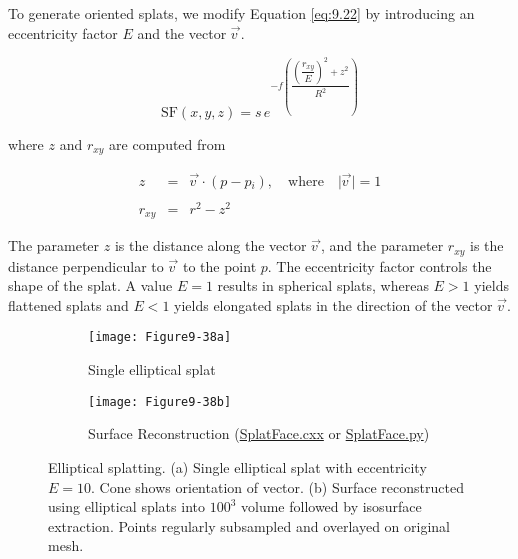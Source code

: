 To generate oriented splats, we modify Equation \ref{eq:9.22} by introducing an eccentricity factor $E$ and the vector $\overrightarrow{v\  }$.

\begin{equation}\label{eq:9.23}
\text{SF}(x, y, z) = s\, e^{-f \left( \dfrac{ \left( \dfrac {r_{xy}}{E} \right) ^2 + z^2}{R^2} \right)}
\end{equation}

\noindent where $z$ and $r_{xy}$ are computed from

\begin{equation}\label{eq:9.24}
\begin{array}{lll}
z &=& \overrightarrow{v\ } \cdot (p - p{_i}), \quad \text{where} \quad \vert \overrightarrow{v\ } \vert = 1 \\ \\
r_{xy} &=& r^2 - z^2
\end{array}
\end{equation}

The parameter $z$ is the distance along the vector $\overrightarrow{v\ }$, and the parameter $r_{xy}$ is the distance perpendicular to $\overrightarrow{v\ }$ to the point $p$. The eccentricity factor controls the shape of the splat. A value $E = 1$ results in spherical splats, whereas $E > 1$ yields flattened splats and $E < 1$ yields elongated splats in the direction of the vector $\overrightarrow{v\ }$.

\begin{figure}[htb]
    \centering
	\begin{subfigure}[h]{0.48\linewidth}
		\texttt{[image: Figure9-38a]}
		\captionsetup{justification=centering}
		\caption{Single elliptical splat}
		\label{fig:Figure9-38a}
	\end{subfigure}
	\hfill
	\begin{subfigure}[h]{0.48\linewidth}
		\texttt{[image: Figure9-38b]}
		\captionsetup{justification=centering}
		\caption{Surface Reconstruction (\href{https://lorensen.github.io/VTKExamples/site/Cxx/VisualizationAlgorithms/SplatFace/}{SplatFace.cxx} or \href{https://lorensen.github.io/VTKExamples/site/Python/VisualizationAlgorithms/SplatFace/}{SplatFace.py})}
		\label{fig:Figure9-38b}
	\end{subfigure}
	\caption{Elliptical splatting. (a) Single elliptical splat with eccentricity $E=10$. Cone shows orientation of vector. (b) Surface reconstructed using elliptical splats into $100^3$ volume followed by isosurface extraction. Points regularly subsampled and overlayed on original mesh.}\label{fig:Figure9-38}
\end{figure}

